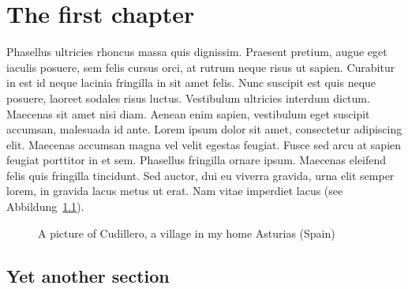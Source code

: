 \documentclass[
  12pt,
  a4paperpaper,
  a4paper]{scrreprt}
\begin{document}

\chapter{The first chapter}\label{the-first-chapter}

Phasellus ultricies rhoncus massa quis dignissim. Praesent pretium,
augue eget iaculis posuere, sem felis cursus orci, at rutrum neque risus
ut sapien. Curabitur in est id neque lacinia fringilla in sit amet
felis. Nunc suscipit est quis neque posuere, laoreet sodales risus
luctus. Vestibulum ultricies interdum dictum. Maecenas sit amet nisi
diam. Aenean enim sapien, vestibulum eget suscipit accumsan, malesuada
id ante. Lorem ipsum dolor sit amet, consectetur adipiscing elit.
Maecenas accumsan magna vel velit egestas feugiat. Fusce sed arcu at
sapien feugiat porttitor in et sem. Phasellus fringilla ornare ipsum.
Maecenas eleifend felis quis fringilla tincidunt. Sed auctor, dui eu
viverra gravida, urna elit semper lorem, in gravida lacus metus ut erat.
Nam vitae imperdiet lacus (see Abbildung~\ref{fig-cudillero}).

\begin{figure}


\caption{\label{fig-cudillero}A picture of Cudillero, a village in my
home Asturias (Spain)}

\end{figure}%

\section{Yet another section}\label{yet-another-section}
\end{document}
